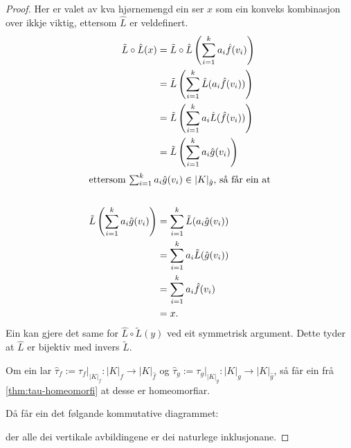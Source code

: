 \documentclass[a4paper, 12pt, norsk]{article}
\theoremstyle{plain}
\theoremstyle{definition}
\newcommand{\Rb}{\mathbb{R}}
\newcommand{\gr}[1]{ \lvert #1 \rvert } %
\begin{document}
\begin{proof}
	Her er valet av kva hjørnemengd ein ser \( x \) som ein konveks kombinasjon over ikkje viktig, ettersom $\hat{L}$ er veldefinert.
	\begin{align*}
		\tilde{L}\circ \hat{L}(x) &= \tilde{L}\circ \hat{L}\left(\sum_{i=1}^ka_i\hat{f}(v_i)\right) \\
		&= \tilde{L}\left(\sum_{i=1}^k\hat{L}(a_i\hat{f}(v_i))\right) \\
		&= \tilde{L}\left(\sum_{i=1}^ka_i\hat{L}(\hat{f}(v_i))\right) \\
		&= \tilde{L}\left(\sum_{i=1}^ka_i\hat{g}(v_i)\right) \\
		\intertext{ettersom $\sum_{i=1}^ka_i\hat{g}(v_i)\in\gr{K}_{\hat{g}}$, så får ein at} \\
		\tilde{L}\left(\sum_{i=1}^ka_i\hat{g}(v_i)\right) &= \sum_{i=1}^k\tilde{L}(a_i\hat{g}(v_i)) \\
		&= \sum_{i=1}^ka_i\tilde{L}(\hat{g}(v_i)) \\
		&= \sum_{i=1}^ka_i\hat{f}(v_i) \\
		&= x.
	\end{align*}
	Ein kan gjere det same for $\hat{L}\circ\tilde{L}(y)$ ved eit symmetrisk argument. Dette tyder at $\hat{L}$ er bijektiv med invers $\tilde{L}$.
	
	Om ein lar $\hat{\tau}_f:=\tau_f|_{\gr{K}_f} : \gr{K}_f \to \gr{K}_{\hat{f}}$ og $\hat{\tau}_g:=\tau_g|_{\gr{K}_g} : \gr{K}_g \to \gr{K}_{\hat{g}}$, så får ein frå \autoref{thm:tau-homeomorfi} at desse er homeomorfiar.
	
	Då får ein det følgande kommutative diagrammet:
	\begin{center} %
	\end{center}
	der alle dei vertikale avbildingene er dei naturlege inklusjonane.


\end{proof}
\end{document}
